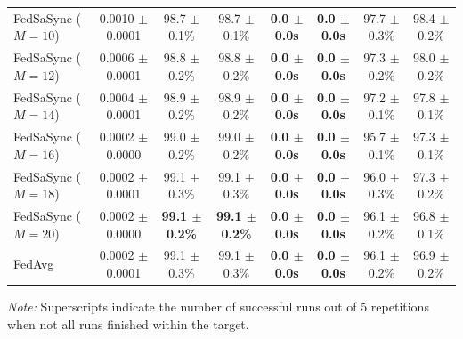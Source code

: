 \begin{table}[t]
{\begin{tabular}{lccccccc}
FedSaSync ($M = 10$) & 0.0010 $\pm$ 0.0001 & 98.7 $\pm$ 0.1\% & 98.7 $\pm$ 0.1\% & \textbf{0.0 $\pm$ 0.0s} & \textbf{0.0 $\pm$ 0.0s} & 97.7 $\pm$ 0.3\% & 98.4 $\pm$ 0.2\% \\
FedSaSync ($M = 12$) & 0.0006 $\pm$ 0.0001 & 98.8 $\pm$ 0.2\% & 98.8 $\pm$ 0.2\% & \textbf{0.0 $\pm$ 0.0s} & \textbf{0.0 $\pm$ 0.0s} & 97.3 $\pm$ 0.2\% & 98.0 $\pm$ 0.2\% \\
FedSaSync ($M = 14$) & 0.0004 $\pm$ 0.0001 & 98.9 $\pm$ 0.2\% & 98.9 $\pm$ 0.2\% & \textbf{0.0 $\pm$ 0.0s} & \textbf{0.0 $\pm$ 0.0s} & 97.2 $\pm$ 0.1\% & 97.8 $\pm$ 0.1\% \\
FedSaSync ($M = 16$) & 0.0002 $\pm$ 0.0000 & 99.0 $\pm$ 0.2\% & 99.0 $\pm$ 0.2\% & \textbf{0.0 $\pm$ 0.0s} & \textbf{0.0 $\pm$ 0.0s} & 95.7 $\pm$ 0.1\% & 97.3 $\pm$ 0.1\% \\
FedSaSync ($M = 18$) & 0.0002 $\pm$ 0.0001 & 99.1 $\pm$ 0.3\% & 99.1 $\pm$ 0.3\% & \textbf{0.0 $\pm$ 0.0s} & \textbf{0.0 $\pm$ 0.0s} & 96.0 $\pm$ 0.3\% & 97.3 $\pm$ 0.2\% \\
FedSaSync ($M = 20$) & 0.0002 $\pm$ 0.0000 & \textbf{99.1 $\pm$ 0.2\%} & \textbf{99.1 $\pm$ 0.2\%} & \textbf{0.0 $\pm$ 0.0s} & \textbf{0.0 $\pm$ 0.0s} & 96.1 $\pm$ 0.2\% & 96.8 $\pm$ 0.1\% \\
FedAvg & 0.0002 $\pm$ 0.0001 & 99.1 $\pm$ 0.3\% & 99.1 $\pm$ 0.3\% & \textbf{0.0 $\pm$ 0.0s} & \textbf{0.0 $\pm$ 0.0s} & 96.1 $\pm$ 0.2\% & 96.9 $\pm$ 0.2\% \\
\hline
\end{tabular}%
}
\par\vspace{0.8em}
\raggedright \footnotesize \textit{Note:} Superscripts indicate the number of successful runs out of 5 repetitions when not all runs finished within the target.
\end{table}